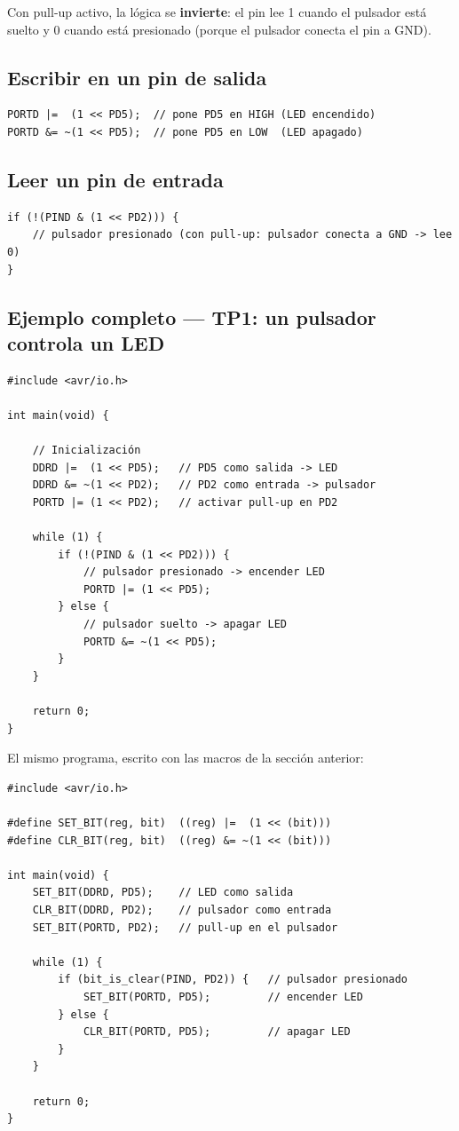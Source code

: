 Con pull-up activo, la lógica se \textbf{invierte}: el pin lee 1 cuando el pulsador
está suelto y 0 cuando está presionado (porque el pulsador conecta el pin a GND).

\subsection{Escribir en un pin de salida}

\begin{lstlisting}[style=estilo-c]
PORTD |=  (1 << PD5);  // pone PD5 en HIGH (LED encendido)
PORTD &= ~(1 << PD5);  // pone PD5 en LOW  (LED apagado)
\end{lstlisting}

\subsection{Leer un pin de entrada}

\begin{lstlisting}[style=estilo-c]
if (!(PIND & (1 << PD2))) {
    // pulsador presionado (con pull-up: pulsador conecta a GND -> lee 0)
}
\end{lstlisting}

\subsection{Ejemplo completo --- TP1: un pulsador controla un LED}

\begin{lstlisting}[style=estilo-c]
#include <avr/io.h>

int main(void) {

    // Inicialización
    DDRD |=  (1 << PD5);   // PD5 como salida -> LED
    DDRD &= ~(1 << PD2);   // PD2 como entrada -> pulsador
    PORTD |= (1 << PD2);   // activar pull-up en PD2

    while (1) {
        if (!(PIND & (1 << PD2))) {
            // pulsador presionado -> encender LED
            PORTD |= (1 << PD5);
        } else {
            // pulsador suelto -> apagar LED
            PORTD &= ~(1 << PD5);
        }
    }

    return 0;
}
\end{lstlisting}

El mismo programa, escrito con las macros de la sección anterior:

\begin{lstlisting}[style=estilo-c]
#include <avr/io.h>

#define SET_BIT(reg, bit)  ((reg) |=  (1 << (bit)))
#define CLR_BIT(reg, bit)  ((reg) &= ~(1 << (bit)))

int main(void) {
    SET_BIT(DDRD, PD5);    // LED como salida
    CLR_BIT(DDRD, PD2);    // pulsador como entrada
    SET_BIT(PORTD, PD2);   // pull-up en el pulsador

    while (1) {
        if (bit_is_clear(PIND, PD2)) {   // pulsador presionado
            SET_BIT(PORTD, PD5);         // encender LED
        } else {
            CLR_BIT(PORTD, PD5);         // apagar LED
        }
    }

    return 0;
}
\end{lstlisting}

